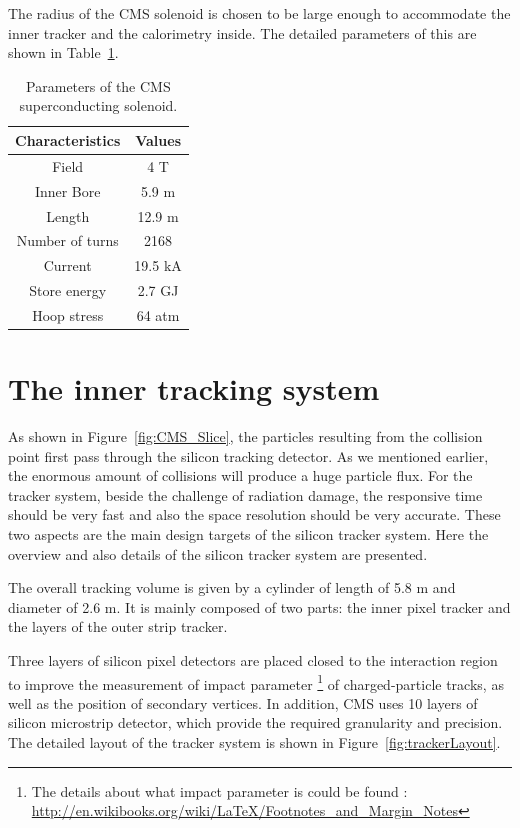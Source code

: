 The radius of the CMS solenoid is chosen to be large enough to accommodate the inner tracker and the calorimetry inside. The detailed parameters of this are shown in Table~\ref{table:magnet}.  

\begin{table}[htb]
\setlength{\tabcolsep}{12pt}
\caption{Parameters of the CMS superconducting solenoid.}
\begin{center}
\begin{tabular}{ cc }
Characteristics & Values \\
\hline
Field           &  4 T \\
Inner Bore  &  5.9 m \\
Length        &  12.9 m \\
Number of turns &  2168 \\
Current   &        19.5 kA  \\
Store energy &  2.7 GJ \\
Hoop stress   &   64 atm \\
\hline
\end{tabular} 
\end{center}
\label{table:magnet}
\end{table}

\section{The inner tracking system}

As shown in Figure~\ref{fig:CMS_Slice}, the particles resulting from the collision point first pass through the silicon tracking detector. As we mentioned earlier, the enormous amount of collisions will produce a huge particle flux. For the tracker system, beside the challenge of radiation damage, the responsive time should be very fast and also the space resolution should be very accurate. These two 
aspects are the main design targets of the silicon tracker system. Here the overview and also details of the silicon tracker system are presented. 

The overall tracking volume is given by a cylinder of length of 5.8 m and diameter of 2.6 m. It is mainly
composed of two parts: the inner pixel tracker and the layers of the outer strip tracker.    

Three layers of silicon pixel detectors are placed closed to the interaction region to improve the measurement of impact parameter \footnote{The details about what impact parameter is could be found : \url{http://en.wikibooks.org/wiki/LaTeX/Footnotes_and_Margin_Notes}} of charged-particle tracks, as well as the position of secondary vertices. 
In addition, CMS uses 10 layers of silicon microstrip detector, which provide the required granularity and precision.  
The detailed layout of the tracker system is shown in Figure~\ref{fig:trackerLayout}. 

